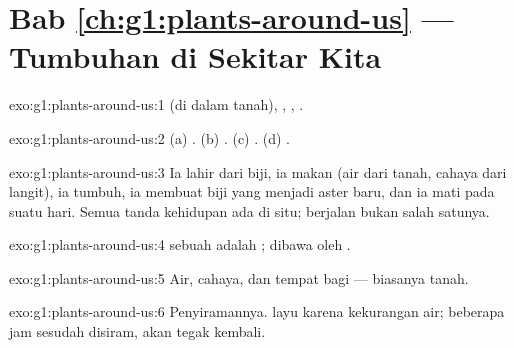 \section*{Bab \ref{ch:g1:plants-around-us} --- Tumbuhan di Sekitar Kita}

\begin{solution}{exo:g1:plants-around-us:1}
 (di dalam tanah), , , .
\end{solution}

\begin{solution}{exo:g1:plants-around-us:2}
(a) . (b) . (c) . (d) .
\end{solution}

\begin{solution}{exo:g1:plants-around-us:3}
Ia lahir dari biji, ia makan (air dari tanah, cahaya dari langit), ia
tumbuh, ia membuat biji yang menjadi  aster baru, dan ia mati
pada suatu hari. Semua tanda kehidupan ada di situ; berjalan bukan
salah satunya.
\end{solution}

\begin{solution}{exo:g1:plants-around-us:4}
 sebuah  adalah ;  dibawa oleh
.
\end{solution}

\begin{solution}{exo:g1:plants-around-us:5}
Air, cahaya, dan tempat bagi  --- biasanya tanah.
\end{solution}

\begin{solution}{exo:g1:plants-around-us:6}
Penyiramannya.  layu karena kekurangan air; beberapa jam
sesudah disiram,  akan tegak kembali.
\end{solution}


